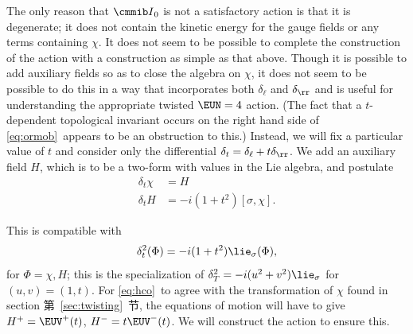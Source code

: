 The only reason that ${{\cmmib I}}_0$ is not a satisfactory action
is that it is degenerate; it does not contain the kinetic energy
for the gauge fields or any terms containing $\chi$. It does not
seem to be possible to complete the construction of the action
with a construction as simple as that above.  Though it is
possible to add auxiliary fields so as to close the algebra on
$\chi$, it does not seem to be possible to do this in a way that
incorporates both $\delta_\ell$ and $\delta_\rr$ and is useful for
understanding the appropriate twisted ${\EUN}=4$ action. (The fact
that a $t$-dependent topological invariant occurs on the right
hand side of \eqref{eq:ormob}\ appears to be an obstruction to this.)
Instead, we will fix a particular value of $t$ and consider only
the differential $\delta_t=\delta_\ell+t\delta_\rr$. We add an
auxiliary field $H$, which is to be a two-form with values in the
Lie algebra, and postulate %
\setcounter{equation}{40}
\begin{equation}\label{eq:hco}
\begin{aligned}\delta_t\chi& = H\\
                           \delta_t H & =
                           -i(1+t^2)[\sigma,\chi].\end{aligned}
\end{equation}

This is compatible with
\setcounter{equation}{41}
\begin{equation}\label{eq:kino}
\delta_t^2(\Phi)=-i(1+t^2){{\lie}}_\sigma(\Phi),
\end{equation}
 for
$\Phi=\chi,H$; this is the specialization of
$\delta_T^2=-i(u^2+v^2)\lie_\sigma$ for $(u,v)=(1,t)$. For \eqref{eq:hco}\
to agree with the transformation of $\chi$ found in section
第~\ref{sec:twisting}~节, the equations of motion will have to give
$H^+=\EUV^+(t)$, $H^-=t\EUV^-(t)$. We will construct the action to
ensure this.

